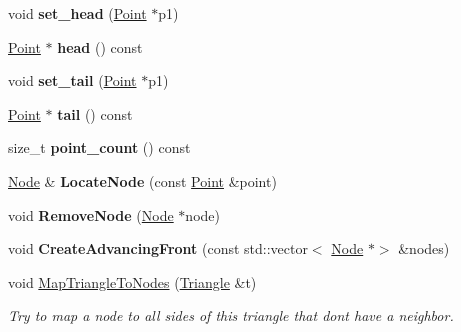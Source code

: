 \begin{DoxyCompactItemize}
\mbox{\label{classp2t_1_1SweepContext_abd31ac7cc3ba9d418e08d5583ae7d32e}} 
void {\bfseries set\+\_\+head} (\hyperlink{structp2t_1_1Point}{Point} $\ast$p1)
\item 
\mbox{\label{classp2t_1_1SweepContext_aaf2c76fcee16a064144bee83f7452e98}} 
\hyperlink{structp2t_1_1Point}{Point} $\ast$ {\bfseries head} () const
\item 
\mbox{\label{classp2t_1_1SweepContext_ac685ab377d5f1b184b4bb94e151a2af9}} 
void {\bfseries set\+\_\+tail} (\hyperlink{structp2t_1_1Point}{Point} $\ast$p1)
\item 
\mbox{\label{classp2t_1_1SweepContext_ac9bdad9a5d768fe4cfa2cb81a8258b50}} 
\hyperlink{structp2t_1_1Point}{Point} $\ast$ {\bfseries tail} () const
\item 
\mbox{\label{classp2t_1_1SweepContext_a8b15732d7078f336d0017475c422c15a}} 
size\+\_\+t {\bfseries point\+\_\+count} () const
\item 
\mbox{\label{classp2t_1_1SweepContext_abd006c55ca41efae6c24a61f9edcdaac}} 
\hyperlink{structp2t_1_1Node}{Node} \& {\bfseries Locate\+Node} (const \hyperlink{structp2t_1_1Point}{Point} \&point)
\item 
\mbox{\label{classp2t_1_1SweepContext_a0ea069bc88f6f7cd4b0022d988017d8d}} 
void {\bfseries Remove\+Node} (\hyperlink{structp2t_1_1Node}{Node} $\ast$node)
\item 
\mbox{\label{classp2t_1_1SweepContext_a7b4165dfb204b7058fe08a7e8611b738}} 
void {\bfseries Create\+Advancing\+Front} (const std\+::vector$<$ \hyperlink{structp2t_1_1Node}{Node} $\ast$$>$ \&nodes)
\item 
\mbox{\label{classp2t_1_1SweepContext_aa1c59ec4b2bc6d6f3b248c452d6993c1}} 
void \hyperlink{classp2t_1_1SweepContext_aa1c59ec4b2bc6d6f3b248c452d6993c1}{Map\+Triangle\+To\+Nodes} (\hyperlink{classp2t_1_1Triangle}{Triangle} \&t)
\begin{DoxyCompactList}\small\item\em Try to map a node to all sides of this triangle that don\textquotesingle{}t have a neighbor. \end{DoxyCompactList}\item 
$$
\end{DoxyCompactItemize}
